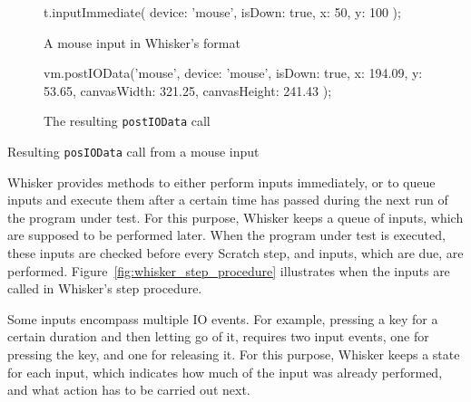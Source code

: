 \begin{listing}[htpb]
    \centering

    \begin{subfigure}[b]{.25\textwidth}
        \begin{javascriptcode}
            t.inputImmediate({
                device: 'mouse',
                isDown: true,
                x: 50,
                y: 100
            });
        \end{javascriptcode}
        \vspace{-\bigskipamount}
        \caption{A mouse input in Whisker's format}
    \end{subfigure}
    \hspace{.08\textwidth}
    \begin{subfigure}[b]{.3\textwidth}
        \begin{javascriptcode}
            vm.postIOData('mouse', {
              device: 'mouse',
              isDown: true,
              x: 194.09,
              y: 53.65,
              canvasWidth: 321.25,
              canvasHeight: 241.43
            });
        \end{javascriptcode}
        \vspace{-\bigskipamount}
        \caption{The resulting \texttt{postIOData} call}
    \end{subfigure}

    \caption{Resulting \texttt{posIOData} call from a mouse input}
    \label{fig:input_conversion_example}
\end{listing}

Whisker provides methods to either perform inputs immediately,
or to queue inputs and execute them after a certain time has passed during the next run of the program under test.
For this purpose, Whisker keeps a queue of inputs, which are supposed to be performed later.
When the program under test is executed, these inputs are checked before every Scratch step,
and inputs, which are due, are performed.
Figure~\ref{fig:whisker_step_procedure} illustrates when the inputs are called in Whisker's step procedure.
\parspace

Some inputs encompass multiple IO events.
For example, pressing a key for a certain duration and then letting go of it, requires two input events,
one for pressing the key, and one for releasing it.
For this purpose, Whisker keeps a state for each input,
which indicates how much of the input was already performed,
and what action has to be carried out next.

